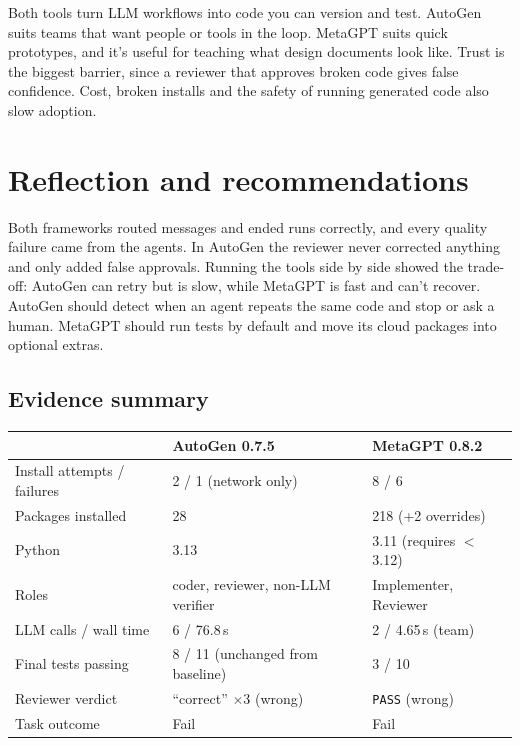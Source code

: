 \documentclass[11pt]{article}
\begin{document}
Both tools turn LLM workflows into code you can version and test. AutoGen suits teams that want people or tools in the loop. MetaGPT suits quick prototypes, and it's useful for teaching what design documents look like. Trust is the biggest barrier, since a reviewer that approves broken code gives false confidence. Cost, broken installs and the safety of running generated code also slow adoption.

\section{Reflection and recommendations}

Both frameworks routed messages and ended runs correctly, and every quality failure came from the agents. In AutoGen the reviewer never corrected anything and only added false approvals. Running the tools side by side showed the trade-off: AutoGen can retry but is slow, while MetaGPT is fast and can't recover. AutoGen should detect when an agent repeats the same code and stop or ask a human. MetaGPT should run tests by default and move its cloud packages into optional extras.

\subsection*{Evidence summary}

\begin{center}
\begin{tabularx}{\textwidth}{@{}lXX@{}}
\toprule
 & AutoGen 0.7.5 & MetaGPT 0.8.2 \\
\midrule
Install attempts / failures & 2 / 1 (network only) & 8 / 6 \\
Packages installed & 28 & 218 (+2 overrides) \\
Python & 3.13 & 3.11 (requires $<$ 3.12) \\
Roles & coder, reviewer, non-LLM verifier & Implementer, Reviewer \\
LLM calls / wall time & 6 / 76.8\,s & 2 / 4.65\,s (team) \\
Final tests passing & 8 / 11 (unchanged from baseline) & 3 / 10 \\
Reviewer verdict & ``correct'' $\times$3 (wrong) & \texttt{PASS} (wrong) \\
Task outcome & Fail & Fail \\
\bottomrule
\end{tabularx}
\end{center}
\end{document}

